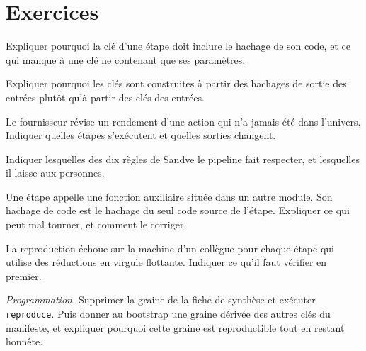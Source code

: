 \section{Exercices}

\begin{exercise}[$\star$]\label{exo:rs:build-a-research-workflow:1}
Expliquer pourquoi la clé d'une étape doit inclure le hachage de son code, et ce qui manque à une clé ne contenant que ses paramètres.
\end{exercise}

\begin{exercise}[$\star$]\label{exo:rs:build-a-research-workflow:2}
Expliquer pourquoi les clés sont construites à partir des hachages de sortie des entrées plutôt qu'à partir des clés des entrées.
\end{exercise}

\begin{exercise}[$\star$]\label{exo:rs:build-a-research-workflow:3}
Le fournisseur révise un rendement d'une action qui n'a jamais été dans l'univers. Indiquer quelles étapes s'exécutent et quelles sorties changent.
\end{exercise}

\begin{exercise}[$\star\star$]\label{exo:rs:build-a-research-workflow:4}
Indiquer lesquelles des dix règles de Sandve le pipeline fait respecter, et lesquelles il laisse aux personnes.
\end{exercise}

\begin{exercise}[$\star\star$]\label{exo:rs:build-a-research-workflow:5}
Une étape appelle une fonction auxiliaire située dans un autre module. Son hachage de code est le hachage du seul code source de l'étape. Expliquer ce qui peut mal tourner, et comment le corriger.
\end{exercise}

\begin{exercise}[$\star\star$]\label{exo:rs:build-a-research-workflow:6}
La reproduction échoue sur la machine d'un collègue pour chaque étape qui utilise des réductions en virgule flottante. Indiquer ce qu'il faut vérifier en premier.
\end{exercise}

\begin{exercise}[$\star\star\star$]\label{exo:rs:build-a-research-workflow:7}
\emph{Programmation.} Supprimer la graine de la fiche de synthèse et exécuter \texttt{reproduce}. Puis donner au bootstrap une graine dérivée des autres clés du manifeste, et expliquer pourquoi cette graine est
reproductible tout en restant honnête.
\end{exercise}

